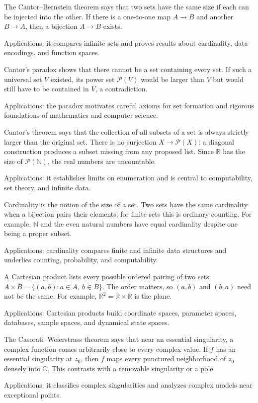 The Cantor--Bernstein theorem says that two sets have the same size if each can be injected into the other. If there is a one-to-one map $A\to B$ and another $B\to A$, then a bijection $A\to B$ exists. \par\noindent Applications: it compares infinite sets and proves results about cardinality, data encodings, and function spaces.

Cantor's paradox shows that there cannot be a set containing every set. If such a universal set $V$ existed, its power set $\mathcal P(V)$ would be larger than $V$ but would still have to be contained in $V$, a contradiction. \par\noindent Applications: the paradox motivates careful axioms for set formation and rigorous foundations of mathematics and computer science.

Cantor's theorem says that the collection of all subsets of a set is always strictly larger than the original set. There is no surjection $X\to\mathcal P(X)$: a diagonal construction produces a subset missing from any proposed list. Since $\mathbb R$ has the size of $\mathcal P(\mathbb N)$, the real numbers are uncountable. \par\noindent Applications: it establishes limits on enumeration and is central to computability, set theory, and infinite data.

Cardinality is the notion of the size of a set. Two sets have the same cardinality when a bijection pairs their elements; for finite sets this is ordinary counting. For example, $\mathbb N$ and the even natural numbers have equal cardinality despite one being a proper subset. \par\noindent Applications: cardinality compares finite and infinite data structures and underlies counting, probability, and computability.

A Cartesian product lists every possible ordered pairing of two sets: $A\times B=\{(a,b):a\in A,\ b\in B\}$. The order matters, so $(a,b)$ and $(b,a)$ need not be the same. For example, $\mathbb R^2=\mathbb R\times\mathbb R$ is the plane. \par\noindent Applications: Cartesian products build coordinate spaces, parameter spaces, databases, sample spaces, and dynamical state spaces.

The Casorati--Weierstrass theorem says that near an essential singularity, a complex function comes arbitrarily close to every complex value. If $f$ has an essential singularity at $z_0$, then $f$ maps every punctured neighborhood of $z_0$ densely into $\mathbb C$. This contrasts with a removable singularity or a pole. \par\noindent Applications: it classifies complex singularities and analyzes complex models near exceptional points.

